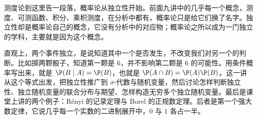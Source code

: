 \label{lec:independence}

测度论到这里告一段落，概率论从独立性开始。前面九讲中的几乎每一个概念，测度、可测函数、积分、乘积测度，在分析中都有，概率论只是给它们换了名字。独立性却是概率论自己的概念，它没有分析中的对应物；概率论之所以成为一门独立的学科，主要就是因为这个概念。

直观上，两个事件独立，是说知道其中一个是否发生，不改变我们对另一个的判断。比如掷两颗骰子，知道第一颗是 $6$，并不影响第二颗是 $6$ 的可能性。用条件概率写出来，就是 $\P(B\mid A)=\P(B)$，也就是 $\P(A\cap B)=\P(A)\P(B)$。这一讲从这个等式出发，把独立性推广到 $\sigma$-代数与随机变量，然后讨论怎样判断独立性、独立随机变量的联合分布与期望、怎样构造无穷多个独立随机变量。最后是课堂上讲的两个例子：Rényi 的记录定理与 Borel 的正规数定理。后者是第一个强大数定律，它说几乎每一个实数的二进制展开中，$0$ 与 $1$ 各占一半。


